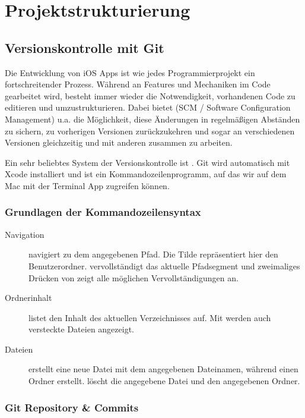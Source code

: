 \documentclass[parskip=half, final]{scrreprt}
\begin{document}
\chapter{Projektstrukturierung}


\section{Versionskontrolle mit Git} \label{sec:git}

Die Entwicklung von iOS Apps ist wie jedes Programmierprojekt ein fortschreitender Prozess. Während an Features und Mechaniken im Code gearbeitet wird, besteht immer wieder die Notwendigkeit, vorhandenen Code zu editieren und umzustrukturieren. Dabei bietet  (SCM / Software Configuration Management) u.a. die Möglichkeit, diese Änderungen in regelmäßigen Abständen zu sichern, zu vorherigen Versionen zurückzukehren und sogar an verschiedenen Versionen gleichzeitig und mit anderen zusammen zu arbeiten.

Ein sehr beliebtes System der Versionskontrolle ist . Git wird automatisch mit Xcode installiert und ist ein Kommandozeilenprogramm, auf das wir auf dem Mac mit der Terminal App zugreifen können.

\subsection{Grundlagen der Kommandozeilensyntax}
\begin{description}
\item[Navigation]  navigiert zu dem angegebenen Pfad. Die Tilde \sh{\~} repräsentiert hier den Benutzerordner. \keys{\tabkey} vervollständigt das aktuelle Pfadsegment und zweimaliges Drücken von \keys{\tab} zeigt alle möglichen Vervollständigungen an.
\item[Ordnerinhalt]  listet den Inhalt des aktuellen Verzeichnisses auf. Mit  werden auch versteckte Dateien angezeigt.
\item[Dateien]  erstellt eine neue Datei mit dem angegebenen Dateinamen, während  einen Ordner erstellt.  löscht die angegebene Datei und  den angegebenen Ordner.
\end{description}

\subsection{Git Repository \& Commits}
 
\end{document}
